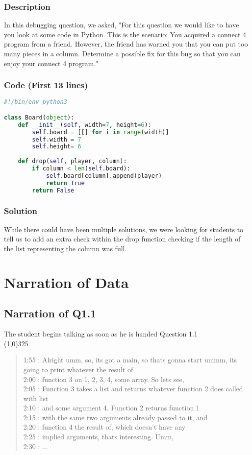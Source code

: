 \documentclass{article}
\begin{document}
\subsubsection{Description}
In this debugging question, we asked, "For this question we would like to have you look at some code in Python. This is the scenario: You acquired a connect 4 program from a friend. However, the friend has warned you that you can put too many pieces in a column. Determine a possible fix for this bug so that you can enjoy your connect 4 program."
\subsubsection{Code (First 13 lines)}
\begin{lstlisting}[language=python]
#!/bin/env python3

class Board(object):
	def __init__(self, width=7, height=6):
		self.board = [[] for i in range(width)]
		self.width = 7
		self.height= 6
	
	def drop(self, player, column):
		if column < len(self.board):
			self.board[column].append(player)
			return True
		return False
\end{lstlisting}
\subsubsection{Solution}
While there could have been multiple solutions, we were looking for students to tell us to add an extra check within the drop function checking if the length of the list representing the column was full.

\newpage
\section{Narration of Data}

\subsection{Narration of Q1.1}
The student begins talking as soon as he is handed Question 1.1 \\
\line(1,0){325}
\begin{quote}
1:55 : Alright umm, so, its got a main, so thats gonna start ummm, its going to print whatever the result of \\
2:00 : function 3 on 1, 2, 3, 4, some array. So lets see, \\
2:05 : Function 3 takes a list and returns whatever function  2 does called with list \\
2:10 : and some argument 4. Function 2 returns function 1 \\
2:15 : with the same two arguments already passed to it, and \\
2:20 : function 4 the result of, which doesn't have any \\
2:25 : implied arguments, thats interesting. Umm, \\
2:30 : ... \\
\end{quote}
\end{document}
